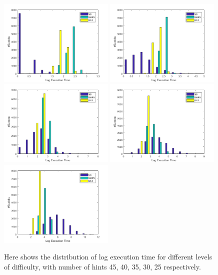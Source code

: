 \documentclass[11pt]{article}
\begin{document}
\begin{figure}
\begin{center}
\includegraphics[width=0.49\textwidth]{fig/45Hints.png} 
\includegraphics[width=0.49\textwidth]{fig/40Hints.png} 
\includegraphics[width=0.49\textwidth]{fig/35Hints.png} 
\includegraphics[width=0.49\textwidth]{fig/30Hints.png} 
\includegraphics[width=0.49\textwidth]{fig/25Hints.png}
\end{center}

\caption{Here shows the distribution of log execution time for different levels of difficulty, with number of hints 45, 40, 35, 30, 25 respectively.}
\label{distribution}
\end{figure}
\end{document}
